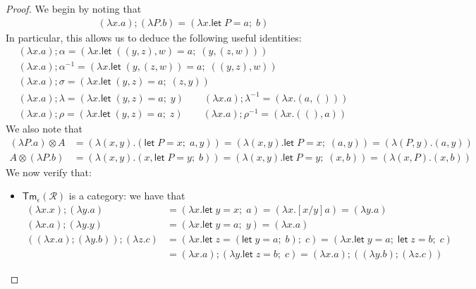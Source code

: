\documentclass[acmsmall,screen,anonymous,review]{acmart}
\newcommand{\mc}[1]{\ensuremath{\mathcal{#1}}}
\newcommand{\ms}[1]{\ensuremath{\mathsf{#1}}}
\newcommand{\letexpr}[3]{\ensuremath{\ms{let}\;#1 = #2;\;#3}}
\begin{document}
\begin{proof}
We begin by noting that
\begin{gather*}
  (\lambda x . a) ; (\lambda P . b) = (\lambda x . \letexpr{P}{a}{b})
\end{gather*}
In particular, this allows us to deduce the following useful identities:
\begin{gather*}
  (\lambda x. a) ; \alpha = (\lambda x. \letexpr{((y, z), w)}{a}{(y, (z, w))}) \\
  (\lambda x. a) ; \alpha^{-1} = (\lambda x. \letexpr{(y, (z, w))}{a}{((y, z), w)}) \\
  (\lambda x. a) ; \sigma = (\lambda x. \letexpr{(y, z)}{a}{(z, y)}) \\
  (\lambda x. a) ; \lambda = (\lambda x. \letexpr{(y, z)}{a}{y}) \qquad
  (\lambda x. a) ; \lambda^{-1} = (\lambda x. (a, ())) \\
  (\lambda x. a) ; \rho = (\lambda x. \letexpr{(y, z)}{a}{z}) \qquad
  (\lambda x. a) ; \rho^{-1} = (\lambda x. ((), a))
\end{gather*}
We also note that
\begin{align*}
  (\lambda P . a) \otimes A 
    &= (\lambda (x, y) . (\letexpr{P}{x}{a}, y))
    = (\lambda (x, y) . \letexpr{P}{x}{(a, y)})
    = (\lambda (P, y) . (a, y)) \\
  A \otimes (\lambda P . b)
    &= (\lambda (x, y) . (x, \letexpr{P}{y}{b}))
    = (\lambda (x, y) . \letexpr{P}{y}{(x, b)})
    = (\lambda (x, P) . (x, b))
\end{align*}
We now verify that:
\begin{itemize}
  \item $\ms{Tm}_\epsilon(\mc{R})$ is a category: we have that
  \begin{align*}
    (\lambda x . x) ; (\lambda y . a) &= (\lambda x . \letexpr{y}{x}{a}) 
    = (\lambda x . [x/y]a) = (\lambda y . a) \\
    (\lambda x . a) ; (\lambda y . y) &= (\lambda x . \letexpr{y}{a}{y}) = (\lambda x . a) \\
    ((\lambda x . a) ; (\lambda y . b)) ; (\lambda z . c)
    &= (\lambda x . \letexpr{z}{(\letexpr{y}{a}{b})}{c})
    = (\lambda x . \letexpr{y}{a}{\letexpr{z}{b}{c}}) \\
    &= (\lambda x . a) ; (\lambda y . \letexpr{z}{b}{c})
    = (\lambda x . a) ; ((\lambda y . b) ; (\lambda z . c))

\end{align*}
\end{itemize}
\end{proof}
\end{document}
